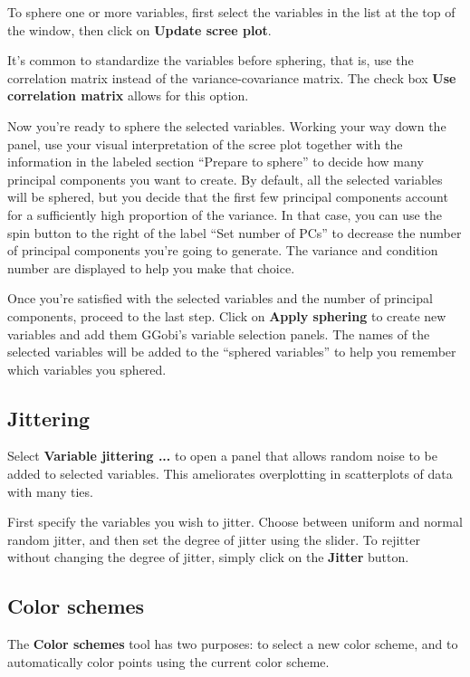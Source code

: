 \documentclass[11pt]{article}
\def\Widget#1{\textbf{#1}}
\begin{document}
To sphere one or more variables, first select the variables in the list
at the top of the window, then click on \Widget{Update scree plot}.

It's common to standardize the variables before sphering, that is, use
the correlation matrix instead of the variance-covariance matrix. The
check box \Widget{Use correlation matrix} allows for this option.

Now you're ready to sphere the selected variables.  Working your way down
the panel, use your visual interpretation of the scree plot together
with the information in the labeled section ``Prepare to sphere'' to
decide how many principal components you want to create.  By default,
all the selected variables will be sphered, but you decide that the first
few principal components account for a sufficiently high proportion of
the variance.  In that case, you can use the spin button to the right
of the label ``Set number of PCs'' to decrease the number of principal
components you're going to generate.  The variance and condition number
are displayed to help you make that choice.

Once you're satisfied with the selected variables and the number of
principal components, proceed to the last step.  Click on
\Widget{Apply sphering} to create new variables and add them GGobi's
variable selection panels.  The names of the selected variables will
be added to the ``sphered variables'' to help you remember which
variables you sphered.

\subsection{Jittering}

Select \Widget{Variable jittering ...} to open a panel that allows
random noise to be added to selected variables.  This ameliorates
overplotting in scatterplots of data with many ties.

First specify the variables you wish to jitter.  Choose between uniform
and normal random jitter, and then set the degree of jitter using the
slider.  To rejitter without changing the degree of jitter, simply click
on the \Widget{Jitter} button.

\subsection{Color schemes}
\label{slbl:ColorSchemes}

The \Widget{Color schemes} tool has two purposes: to select a
new color scheme, and to automatically color points
using the current color scheme.
\end{document}
